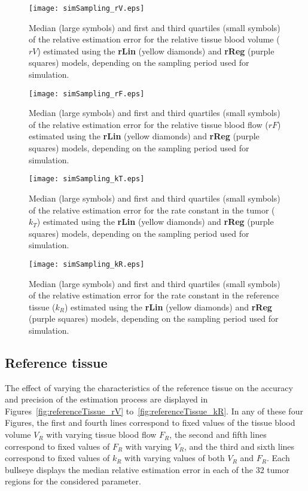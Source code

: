 \begin{subfigures}
    \begin{figure}
        \texttt{[image: simSampling\_rV.eps]}
        \caption{Median (large symbols) and first and third quartiles (small symbols) of the relative estimation error for the relative tissue blood volume ($rV$) estimated using the \textbf{rLin} (yellow diamonds) and \textbf{rReg} (purple squares) models, depending on the sampling period used for simulation.}
        \label{fig:sampling_rV}
    \end{figure}
    \begin{figure}
        \texttt{[image: simSampling\_rF.eps]}
        \caption{Median (large symbols) and first and third quartiles (small symbols) of the relative estimation error for the relative tissue blood flow ($rF$) estimated using the \textbf{rLin} (yellow diamonds) and \textbf{rReg} (purple squares) models, depending on the sampling period used for simulation.}
        \label{fig:sampling_rF}
    \end{figure}
    \begin{figure}
        \texttt{[image: simSampling\_kT.eps]}
        \caption{Median (large symbols) and first and third quartiles (small symbols) of the relative estimation error for the rate constant in the tumor ($k_T$) estimated using the \textbf{rLin} (yellow diamonds) and \textbf{rReg} (purple squares) models, depending on the sampling period used for simulation.}
        \label{fig:sampling_kT}
    \end{figure}
    \begin{figure}
        \texttt{[image: simSampling\_kR.eps]}
        \caption{Median (large symbols) and first and third quartiles (small symbols) of the relative estimation error for the rate constant in the reference tissue ($k_R$) estimated using the \textbf{rLin} (yellow diamonds) and \textbf{rReg} (purple squares) models, depending on the sampling period used for simulation.}
        \label{fig:sampling_kR}
    \end{figure}
\end{subfigures}
\FloatBarrier

\subsection{Reference tissue}
The effect of varying the characteristics of the reference tissue on the accuracy and precision of the estimation process are displayed in Figures~\ref{fig:referenceTissue_rV} to~\ref{fig:referenceTissue_kR}. 
In any of these four Figures, the first and fourth lines correspond to fixed values of the tissue blood volume $V_R$ with varying tissue blood flow $F_R$, the second and fifth lines correspond to fixed values of $F_R$ with varying $V_R$, and the third and sixth lines correspond to fixed values of $k_R$ with varying values of both $V_R$ and $F_R$.
Each bullseye displays the median relative estimation error in each of the 32 tumor regions for the considered parameter.

